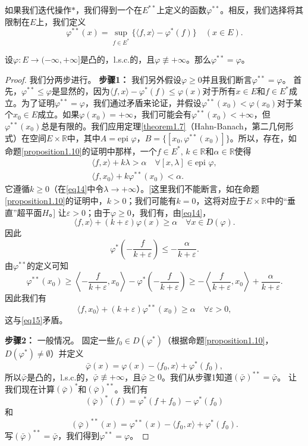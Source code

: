 如果我们迭代操作$*$，我们得到一个在$E^{**}$上定义的函数$\varphi^{**}$。相反，我们选择将其限制在$E$上，我们定义
\[ \varphi^{**}(x) = \sup_{f \in E^*} \{\langle f, x \rangle - \varphi^*(f)\} \quad (x \in E). \]
\begin{theorem}\label{theorem1.11}
设$\varphi: E \to (-\infty, +\infty]$是凸的，l.s.c.的，且$\varphi \not\equiv +\infty$。那么$\varphi^{**}=\varphi$。
\end{theorem}
\begin{proof}
我们分两步进行。
\textbf{步骤1：} 我们另外假设$\varphi \geq 0$并且我们断言$\varphi^{**}=\varphi$。
首先，$\varphi^{**} \leq \varphi$是显然的，因为$\langle f, x \rangle - \varphi^*(f) \leq \varphi(x)$对于所有$x \in E$和$f \in E^*$成立。为了证明$\varphi^{**}=\varphi$，我们通过矛盾来论证，并假设$\varphi^{**}(x_0) < \varphi(x_0)$对于某个$x_0 \in E$成立。如果$\varphi(x_0)=+\infty$，我们可能会有$\varphi^{**}(x_0) < +\infty$，但$\varphi^{**}(x_0)$总是有限的。我们应用定理\ref{theorem1.7}（Hahn-Banach，第二几何形式）在空间$E \times \mathbb{R}$中，其中$A=\text{epi } \varphi$，$B=\{[x_0, \varphi^{**}(x_0)]\}$。所以，存在，如命题\ref{proposition1.10}的证明中那样，一个$f \in E^*$, $k \in \mathbb{R}$和$\alpha \in \mathbb{R}$使得
\begin{gather}
\langle f, x \rangle + k\lambda > \alpha \quad \forall [x, \lambda] \in \text{epi } \varphi, \label{eq14} \\
\langle f, x_0 \rangle + k\varphi^{**}(x_0) < \alpha. \label{eq15}
\end{gather}
它遵循$k \geq 0$（在\eqref{eq14}中令$\lambda \to +\infty$）。[这里我们不能断言，如在命题\ref{proposition1.10}的证明中，$k>0$；我们可能有$k=0$，这将对应于$E \times \mathbb{R}$中的“垂直”超平面$H$。]
让$\varepsilon > 0$；由于$\varphi \geq 0$，我们有，由\eqref{eq14}，
\[ \langle f, x \rangle + (k+\varepsilon)\varphi(x) \geq \alpha \quad \forall x \in D(\varphi). \]
因此
\[ \varphi^*\left(-\frac{f}{k+\varepsilon}\right) \leq -\frac{\alpha}{k+\varepsilon}. \]
由$\varphi^{**}$的定义可知
\[ \varphi^{**}(x_0) \geq \left\langle -\frac{f}{k+\varepsilon}, x_0 \right\rangle - \varphi^*\left(-\frac{f}{k+\varepsilon}\right) \geq -\left\langle \frac{f}{k+\varepsilon}, x_0 \right\rangle + \frac{\alpha}{k+\varepsilon}. \]
因此我们有
\[ \langle f, x_0 \rangle + (k+\varepsilon)\varphi^{**}(x_0) \geq \alpha \quad \forall \varepsilon > 0, \]
这与\eqref{eq15}矛盾。

\textbf{步骤2：} 一般情况。
固定一些$f_0 \in D(\varphi^*)$（根据命题\ref{proposition1.10}，$D(\varphi^*) \neq \emptyset$）并定义
\[ \bar{\varphi}(x) = \varphi(x) - \langle f_0, x \rangle + \varphi^*(f_0), \]
所以$\bar{\varphi}$是凸的，l.s.c.的，$\bar{\varphi} \not\equiv +\infty$，且$\bar{\varphi} \geq 0$。我们从步骤1知道$(\bar{\varphi})^{**} = \bar{\varphi}$。
让我们现在计算$(\bar{\varphi})^*$和$(\bar{\varphi})^{**}$。我们有
\[ (\bar{\varphi})^*(f) = \varphi^*(f+f_0) - \varphi^*(f_0) \]
和
\[ (\bar{\varphi})^{**}(x) = \varphi^{**}(x) - \langle f_0, x \rangle + \varphi^*(f_0). \]
写$(\bar{\varphi})^{**} = \bar{\varphi}$，我们得到$\varphi^{**} = \varphi$。
\end{proof}

